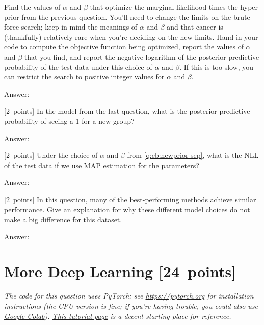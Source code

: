\documentclass{article}
\newcommand{\ask}[1]{\textcolor{question}{#1}}
\newenvironment{answer}{\par\begingroup\color{answer}Answer: }{\endgroup}
\newcommand{\pts}[1]{\textcolor{points}{[#1~points]}}
\newcommand{\meta}[1]{\textcolor{black!60!white}{\emph{#1}}}
\newcommand{\TODO}{\color{red}{TODO}}
\begin{document}
\begin{qlist}
    Find the values of $\alpha$ and $\beta$ that optimize the marginal likelihood times the hyper-prior from the previous question.
    You'll need to change the limits on the brute-force search;
    keep in mind the meanings of $\alpha$ and $\beta$ and that cancer is (thankfully) relatively rare when you're deciding on the new limits.
    \ask{Hand in your code to compute the objective function being optimized,
         report the values of $\alpha$ and $\beta$ that you find,
         and report the negative logarithm of the posterior predictive probability of the test data under this choice of $\alpha$ and $\beta$.}
    If this is too slow, you can restrict the search to positive integer values for $\alpha$ and $\beta$.

\begin{answer}\TODO\end{answer}

\item \pts{2}
    In the model from the last question,
    \ask{what is the posterior predictive probability of seeing a 1 for a new group?}

\begin{answer}\TODO\end{answer}

\item \pts{2}
    Under the choice of $\alpha$ and $\beta$ from \cref{q:eb:newprior-sep},
    \ask{what is the NLL of the test data if we use MAP estimation for the parameters?}

\begin{answer}\TODO\end{answer}

\item \pts{2}
    In this question, many of the best-performing methods achieve similar performance.
    \ask{Give an explanation for why these different model choices do not make a big difference for this dataset.}

\begin{answer}\TODO\end{answer}
\end{qlist}


\clearpage
\section{More Deep Learning \pts{24}}

\meta{The code for this question uses PyTorch; see \url{https://pytorch.org} for installation instructions (the CPU version is fine; if you're having trouble, you could also use \href{https://colab.research.google.com/}{Google Colab}). \href{https://pytorch.org/tutorials/beginner/basics/tensorqs_tutorial.html}{This tutorial page} is a decent starting place for reference.}
\end{document}
